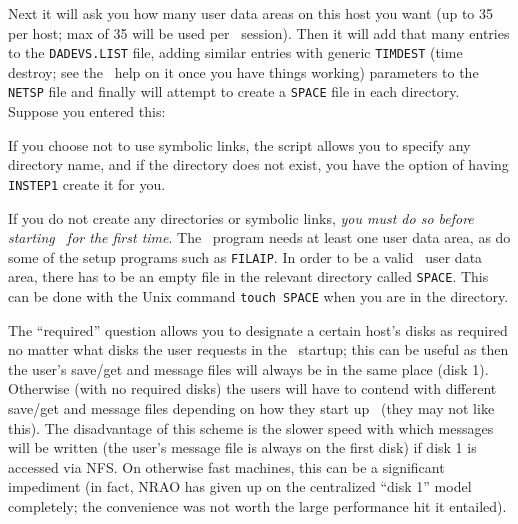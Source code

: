 Next it will ask you how many user data areas on this host you want (up
to 35 per host; max of 35 will be used per \AIPS\ session).  Then it
will add that many entries to the {\tt DADEVS.LIST} file, adding similar
entries with generic {\tt TIMDEST} (time destroy; see the \ttaips\ help
on it once you have things working) parameters to the {\tt NETSP} file
and finally will attempt to create a {\tt SPACE} file in each directory.
Suppose you entered this:\medskip

\medskip

\noindent If you choose not to use symbolic links, the script allows you
to specify any directory name, and if the directory does not exist, you
have the option of having {\tt INSTEP1} create it for you.

If you do not create any directories or symbolic links, {\it you must do
so before starting \ttaips\ for the first time\/}.  The \ttaips\ program
needs at least one user data area, as do some of the setup programs such
as {\tt FILAIP}.  In order to be a valid \AIPS\ user data area, there
has to be an empty file in the relevant directory called {\tt SPACE}.
This can be done with the Unix command {\tt touch SPACE} when you are in
the directory.

The ``required'' question allows you to designate a certain host's disks
as required no matter what disks the user requests in the
\AIPS\ startup; this can be useful as then the user's save/get and
message files will always be in the same place (disk 1).  Otherwise
(with no required disks) the users will have to contend with different
save/get and message files depending on how they start up \ttaips\ (they
may not like this).  The disadvantage of this scheme is the slower speed
with which messages will be written (the user's message file is always
on the first disk) if disk 1 is accessed via NFS.  On otherwise fast
machines, this can be a significant impediment (in fact, NRAO has given
up on the centralized ``disk 1'' model completely; the convenience was
not worth the large performance hit it entailed).

